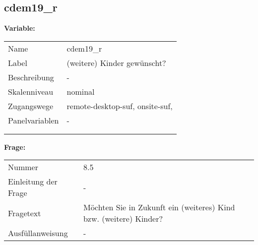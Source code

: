 	
	
	\subsection{cdem19\_r}
	\label{subSection:cdem19_r}

	\noindent\textbf{Variable:}\\
		\begin{tabular}{lL{11.3cm}}
			\label{tableVariable:cdem19_r}
			Name & cdem19\_r \\
			Label & (weitere) Kinder gewünscht? \\
			Beschreibung & - \\
			Skalenniveau & nominal \\
			Zugangswege &
				remote-desktop-suf,
				onsite-suf,
 \\
			Panelvariablen & -
			 \\
			 \\
 \\
		\end{tabular}

		\vspace*{1 cm}
		\noindent\textbf{Frage:}\\
		\begin{tabular}{lL{11.3cm}}
			\label{tableQuestion:cdem19_r}
			Nummer & 8.5 \\
			Einleitung der Frage & - \\
			Fragetext & Möchten Sie in Zukunft ein (weiteres) Kind bzw. (weitere) Kinder? \\
			Ausfüllanweisung & - \\
		\end{tabular}





